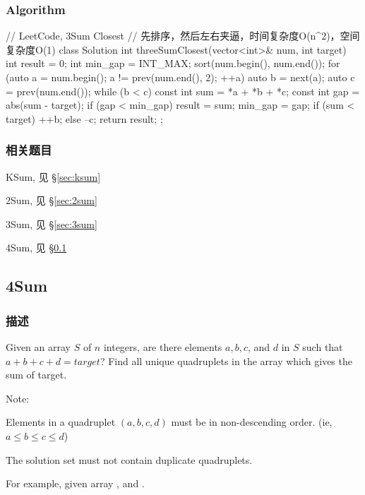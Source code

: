 \subsubsection{Algorithm}
\begin{Code}
	// LeetCode, 3Sum Closest
	// 先排序，然后左右夹逼，时间复杂度O(n^2)，空间复杂度O(1)
	class Solution {
		int threeSumClosest(vector<int>& num, int target) {
			int result = 0;
			int min_gap = INT_MAX;
			sort(num.begin(), num.end());
			for (auto a = num.begin(); a != prev(num.end(), 2); ++a) {
				auto b = next(a);
				auto c = prev(num.end());
				while (b < c) {
					const int sum = *a + *b + *c;
					const int gap = abs(sum - target);
					if (gap < min_gap) {
						result = sum;
						min_gap = gap;
					}
					if (sum < target) ++b;
					else              --c;
				}
			}
			return result;
		}
	};
\end{Code}


\subsubsection{相关题目}
\begindot
\item KSum, 见 \S \ref{sec:ksum}
\item 2Sum, 见 \S \ref{sec:2sum}
\item 3Sum, 见 \S \ref{sec:3sum}
\item 4Sum, 见 \S \ref{sec:4sum}
\myenddot


\subsection{4Sum} %
\label{sec:4sum}


\subsubsection{描述}
Given an array $S$ of $n$ integers, are there elements $a, b, c$, and $d$ in 
$S$ such that $a + b + c + d = target$? Find all unique quadruplets in the 
array which gives the sum of target.

Note:
\begindot
\item Elements in a quadruplet $(a,b,c,d)$ must be in non-descending order. 
(ie, $a \leq b \leq c \leq d$)
\item The solution set must not contain duplicate quadruplets.
\myenddot

For example, given array , and . 

